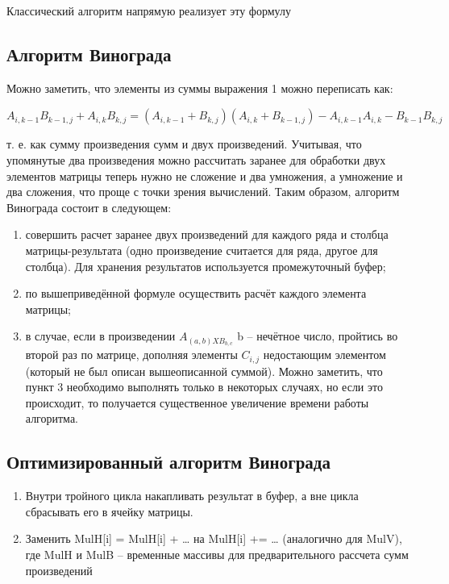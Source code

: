 \documentclass[a4paper, 14pt]{article}
\begin{document}
	Классический алгоритм напрямую реализует эту формулу

	\subsection{Алгоритм Винограда}
	
	Можно заметить, что элементы из суммы выражения 1 можно переписать как:
	
	\begin{math}
		A_{i, k-1}B_{k-1,j} + A_{i,k}B_{k,j} = (A_{i,k-1} + B_{k,j})(A_{i,k} + B_{k-1,j}) - A_{i,k-1}A_{i,k} - B_{k-1}B_{k,j}
	\end{math}
	
	т. е. как сумму произведения сумм и двух произведений. Учитывая, что упомянутые два произведения можно рассчитать заранее для обработки двух элементов матрицы теперь нужно не сложение и два умножения, а умножение и два сложения, что проще с точки зрения вычислений. Таким образом, алгоритм Винограда состоит в следующем:
	
	\begin{enumerate}
		\item совершить расчет заранее двух произведений для каждого ряда и столбца матрицы-результата (одно произведение считается для ряда, другое для столбца). Для хранения результатов используется промежуточный буфер;
		
		\item по вышеприведённой формуле осуществить расчёт каждого элемента матрицы;
		
		\item в случае, если в произведении $A_{(a,b) X B_{b,c}}$ b – нечётное число, пройтись во второй раз по матрице, дополняя элементы $C_{i,j}$ недостающим элементом (который не был описан вышеописанной суммой). Можно заметить, что пункт 3 необходимо выполнять только в некоторых случаях, но если это происходит, то получается существенное увеличение времени работы алгоритма.
	\end{enumerate} 
	
	\subsection{Оптимизированный алгоритм Винограда}
	
	\begin{enumerate}
		\item Внутри тройного цикла накапливать результат в буфер, а вне цикла сбрасывать его в ячейку матрицы.
		\item Заменить MulH[i] = MulH[i] + … на MulH[i] += … (аналогично для MulV),
		где MulH и MulB – временные массивы для предварительного рассчета сумм произведений
		
	\end{enumerate}
\end{document}
